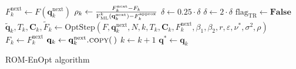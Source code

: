 \begin{algorithm}[H]
\begin{algorithmic}[1]
\State $F^\mathrm{next}_k\gets F(\mathbf{q}^\mathrm{next}_k)$
\State $\rho_k\gets \frac{F^\mathrm{next}_k-F_k}{\Call{F$_\mathrm{ML}^k$}{\mathbf{q}^\mathrm{next}_k}-F^\mathrm{approx}_k}$
\State $\delta\gets0.25\cdot\delta$
\EndIf
{}
\State $\delta\gets2\cdot\delta$
\EndIf
{}
\State $\mathrm{flag}_\mathrm{TR}\gets\mathbf{False}$
\EndIf
\EndWhile
\EndWhile
\State $\tilde{\mathbf{q}}_k,T_k,\mathbf{C}_k,\tilde{F}_k\gets\mathrm{OptStep}(F,\mathbf{q}^\mathrm{next}_k,N,k,T_k,\mathbf{C}_k, F^\mathrm{next}_k, \beta_1, \beta_2, r, \varepsilon ,\nu^*, \sigma^2, \rho)$
\State $F_k \gets F^\mathrm{next}_k$
\State $\mathbf{q}_k \gets \mathbf{q}^\mathrm{next}_k\Call{.copy}{\:}$
\State $k\gets k+1$
\EndWhile
\State \Return $\mathbf{q}^*\gets\mathbf{q}_k$
\EndFunction
\end{algorithmic}
\end{algorithm}

\begin{algorithm}[H]%
\caption{\label{ROM-EnOpt}ROM-EnOpt algorithm}
\begin{algorithmic}[1]
\State \Return {}
\EndFunction
\end{algorithmic}
\end{algorithm}